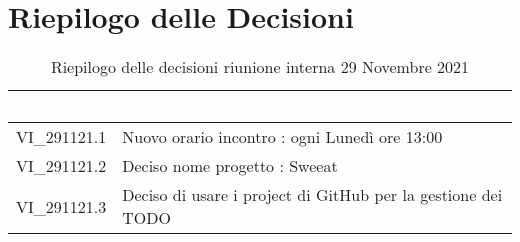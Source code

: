\section{Riepilogo delle Decisioni}


\begin{table}[!htbp]
\renewcommand{\arraystretch}{1.5}
\begin{tabular}{m{}<{\centering}  m{}<{\centering}}
\rowcolor{darkblue} \textcolor{white}{\textbf{Codice}} & \textcolor{white}{\textbf{Decisione}} \\
\hline
VI\_291121.1 & Nuovo orario incontro : ogni Lunedì ore 13:00 \\
\rowcolor{gray!10} VI\_291121.2 & Deciso nome progetto : Sweeat \\
VI\_291121.3 & Deciso di usare i project di GitHub per la gestione dei TODO\\
\end{tabular}
\caption{Riepilogo delle decisioni riunione interna 29 Novembre 2021}
\end{table}